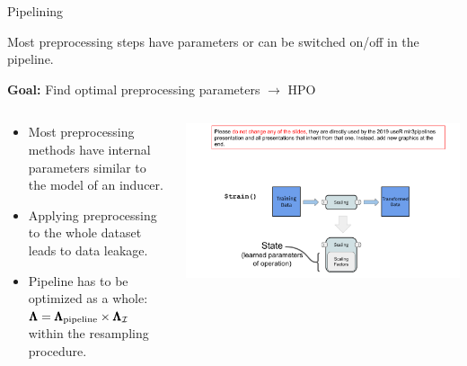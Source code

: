 \begin{frame}{Pipelining}

  Most preprocessing steps have parameters or can be switched on/off in the pipeline.

  \vspace{1em}

  \textbf{Goal:} Find optimal preprocessing parameters $\rightarrow$ HPO

  \begin{columns}
    \begin{column}{0.5\textwidth}
    \begin{itemize}
      \item Most preprocessing methods have internal parameters similar to the model of an inducer.
      \item Applying preprocessing to the whole dataset leads to data leakage.
      \item Pipeline has to be optimized as a whole: $\pmb{\Lambda} = \pmb{\Lambda}_{\text{pipeline}} \times \pmb{\Lambda}_{\mathcal{I}}$ within the resampling procedure.
    \end{itemize}
    \end{column}%
    \begin{column}{0.5\textwidth}
      \begin{center}
        \includegraphics[page=19, width=\textwidth, trim=20 60 30 35, clip]{images/mlr3Pipelines_graphics}
      \end{center}
    \end{column}
  \end{columns}

\end{frame}

